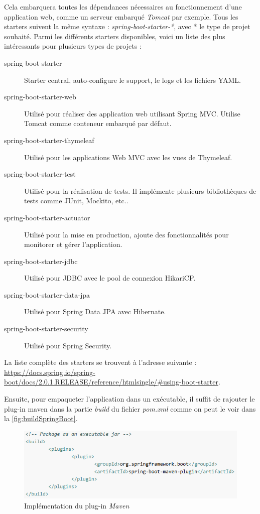 \documentclass{polytech/polytech}
\begin{document}
Cela embarquera toutes les dépendances nécessaires au fonctionnement d'une application web, comme un serveur embarqué \textit{Tomcat} par exemple. Tous les starters suivent la même syntaxe : \textit{spring-boot-starter-*}, avec * le type de projet souhaité. Parmi les différents starters disponibles, voici un liste des plus intéressants pour plusieurs types de projets :

\begin{description}
	\item[spring-boot-starter] Starter central, auto-configure le support, le logs et les fichiers YAML.
	\item[spring-boot-starter-web] Utilisé pour réaliser des application web utilisant Spring MVC. Utilise Tomcat comme conteneur embarqué par défaut.
	\item[spring-boot-starter-thymeleaf] Utilisé pour les applications Web MVC avec les vues de Thymeleaf.
	\item[spring-boot-starter-test] Utilisé pour la réalisation de tests. Il implémente plusieurs bibliothèques de tests comme JUnit, Mockito, etc..
	\item[spring-boot-starter-actuator] Utilisé pour la mise en production, ajoute des fonctionnalités pour monitorer et gérer l’application. 
	\item[spring-boot-starter-jdbc] Utilisé pour JDBC avec le pool de connexion HikariCP.
	\item[spring-boot-starter-data-jpa] Utilisé pour Spring Data JPA avec Hibernate.
	\item[spring-boot-starter-security] Utilisé pour Spring Security.
\end{description}

La liste complète des starters se trouvent à l’adresse suivante : \url{https://docs.spring.io/spring-boot/docs/2.0.1.RELEASE/reference/htmlsingle/#using-boot-starter}.

Ensuite, pour empaqueter l'application dans un exécutable, il suffit de rajouter le plug-in maven dans la partie \textit{build} du fichier \textit{pom.xml} comme on peut le voir dans la \autoref{fig:buildSpringBoot}.

\begin{figure}
	\includegraphics[scale=1]{images/buildSpringBoot}
	\caption{Implémentation du plug-in \textit{Maven}}
	\label{fig:buildSpringBoot}
\end{figure}
\end{document}
